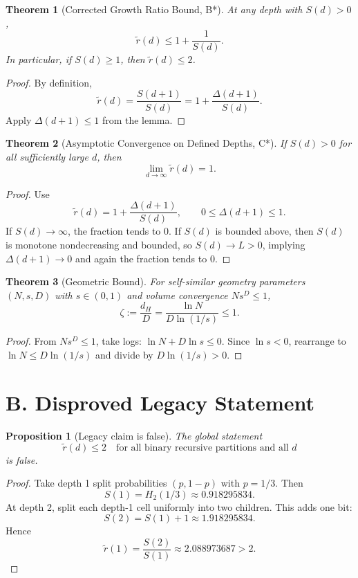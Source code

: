 \documentclass[11pt]{article}
\newtheorem{theorem}{Theorem}
\newtheorem{proposition}{Proposition}
\theoremstyle{remark}
\begin{document}
\begin{theorem}[Corrected Growth Ratio Bound, B*]
At any depth with $S(d)>0$,
\[
\tilde r(d)\le 1+\frac{1}{S(d)}.
\]
In particular, if $S(d)\ge1$, then $\tilde r(d)\le2$.
\end{theorem}

\begin{proof}
By definition,
\[
\tilde r(d)=\frac{S(d+1)}{S(d)}=1+\frac{\Delta(d+1)}{S(d)}.
\]
Apply $\Delta(d+1)\le1$ from the lemma.
\end{proof}

\begin{theorem}[Asymptotic Convergence on Defined Depths, C*]
If $S(d)>0$ for all sufficiently large $d$, then
\[
\lim_{d\to\infty}\tilde r(d)=1.
\]
\end{theorem}

\begin{proof}
Use
\[
\tilde r(d)=1+\frac{\Delta(d+1)}{S(d)},\qquad 0\le\Delta(d+1)\le1.
\]
If $S(d)\to\infty$, the fraction tends to $0$. If $S(d)$ is bounded above, then $S(d)$ is monotone nondecreasing and bounded, so $S(d)\to L>0$, implying $\Delta(d+1)\to0$ and again the fraction tends to $0$.
\end{proof}

\begin{theorem}[Geometric Bound]
For self-similar geometry parameters $(N,s,D)$ with $s\in(0,1)$ and volume convergence $Ns^D\le1$,
\[
\zeta:=\frac{d_H}{D}=\frac{\ln N}{D\ln(1/s)}\le1.
\]
\end{theorem}

\begin{proof}
From $Ns^D\le1$, take logs:
$\ln N + D\ln s\le0$. Since $\ln s<0$, rearrange to
$\ln N\le D\ln(1/s)$ and divide by $D\ln(1/s)>0$.
\end{proof}

\section*{B. Disproved Legacy Statement}

\begin{proposition}[Legacy claim is false]
The global statement
\[
\tilde r(d)\le2\quad\text{for all binary recursive partitions and all }d
\]
is false.
\end{proposition}

\begin{proof}
Take depth 1 split probabilities $(p,1-p)$ with $p=1/3$. Then
\[
S(1)=H_2(1/3)\approx0.918295834.
\]
At depth 2, split each depth-1 cell uniformly into two children. This adds one bit:
\[
S(2)=S(1)+1\approx1.918295834.
\]
Hence
\[
\tilde r(1)=\frac{S(2)}{S(1)}\approx2.088973687>2.
\]
\end{proof}
\end{document}
